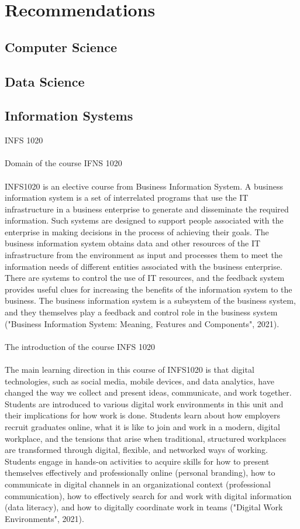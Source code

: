 \documentclass{article}
\begin{document}
	\section{Recommendations}
	\subsection{Computer Science}
	\subsection{Data Science}
	\subsection{Information Systems}
	INFS 1020 \\
	\\
	Domain of the course IFNS 1020 \\
	\\
	INFS1020 is an elective course from Business Information System. A business information system is a set of interrelated programs that use the IT infrastructure in a business enterprise to generate and disseminate the required information. Such systems are designed to support people associated with the enterprise in making decisions in the process of achieving their goals. The business information system obtains data and other resources of the IT infrastructure from the environment as input and processes them to meet the information needs of different entities associated with the business enterprise. There are systems to control the use of IT resources, and the feedback system provides useful clues for increasing the benefits of the information system to the business. The business information system is a subsystem of the business system, and they themselves play a feedback and control role in the business system ("Business Information System: Meaning, Features and Components", 2021). \\
	\\
	The introduction of the course INFS 1020 \\
	\\
	The main learning direction in this course of INFS1020 is that digital technologies, such as social media, mobile devices, and data analytics, have changed the way we collect and present ideas, communicate, and work together. Students are introduced to various digital work environments in this unit and their implications for how work is done. Students learn about how employers recruit graduates online, what it is like to join and work in a modern, digital workplace, and the tensions that arise when traditional, structured workplaces are transformed through digital, flexible, and networked ways of working. Students engage in hands-on activities to acquire skills for how to present themselves effectively and professionally online (personal branding), how to communicate in digital channels in an organizational context (professional communication), how to effectively search for and work with digital information (data literacy), and how to digitally coordinate work in teams ("Digital Work Environments", 2021). \\
\end{document}
